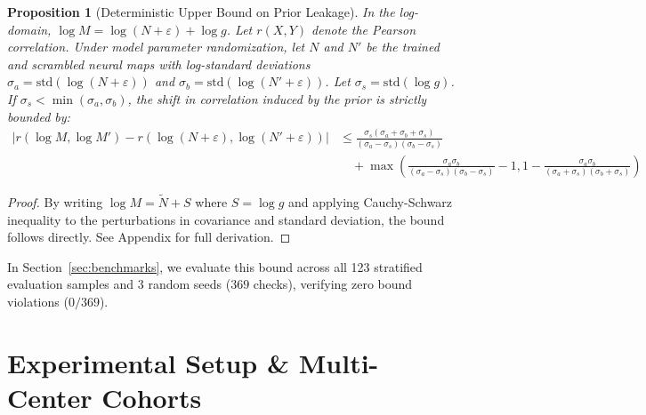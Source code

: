 \documentclass[11pt,a4paper]{article}
\newtheorem{proposition}{Proposition}
\begin{document}
\begin{proposition}[Deterministic Upper Bound on Prior Leakage]
In the log-domain, $\log M = \log(N + \varepsilon) + \log g$. Let $r(X, Y)$ denote the Pearson correlation. Under model parameter randomization, let $N$ and $N'$ be the trained and scrambled neural maps with log-standard deviations $\sigma_a = \text{std}(\log(N+\varepsilon))$ and $\sigma_b = \text{std}(\log(N'+\varepsilon))$. Let $\sigma_s = \text{std}(\log g)$. If $\sigma_s < \min(\sigma_a, \sigma_b)$, the shift in correlation induced by the prior is strictly bounded by:
\begin{equation}
\label{eq:leakage_bound}
\begin{split}
|r(\log M, \log M') - r(\log(N+\varepsilon), \log(N'+\varepsilon))| &\le \frac{\sigma_s(\sigma_a + \sigma_b + \sigma_s)}{(\sigma_a - \sigma_s)(\sigma_b - \sigma_s)} \\
&\quad + \max\left( \frac{\sigma_a \sigma_b}{(\sigma_a - \sigma_s)(\sigma_b - \sigma_s)} - 1, 1 - \frac{\sigma_a \sigma_b}{(\sigma_a + \sigma_s)(\sigma_b + \sigma_s)} \right)
\end{split}
\end{equation}
\end{proposition}
\begin{proof}
By writing $\log M = \tilde{N} + S$ where $S = \log g$ and applying Cauchy-Schwarz inequality to the perturbations in covariance and standard deviation, the bound follows directly. See Appendix for full derivation.
\end{proof}
In Section~\ref{sec:benchmarks}, we evaluate this bound across all 123 stratified evaluation samples and 3 random seeds ($369$ checks), verifying zero bound violations ($0/369$).

\section{Experimental Setup \& Multi-Center Cohorts}
\label{sec:setup}
\end{document}
